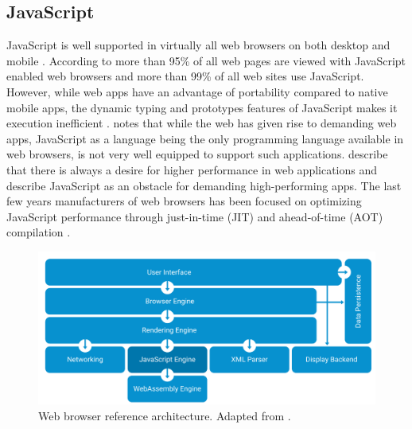 \subsection{JavaScript}

JavaScript is well supported in virtually all web browsers on both desktop and mobile \parencite{Zakai2011}. According to \textcite{TiwariSolihin2012} more than 95\% of all web pages are viewed with JavaScript enabled web browsers and more than 99\% of all web sites use JavaScript. However, while web apps have an advantage of portability compared to native mobile apps, the dynamic typing and prototypes features of JavaScript makes it execution inefficient \parencite{ParkJungMoon2015}. \textcite{HaasRossbergSchuffTitzerHolmanGohmanWagnerZakaiBastien2017} notes that while the web has given rise to demanding web apps, JavaScript as a language being the only programming language available in web browsers, is not very well equipped to support such applications. \textcite{ReiserBlaser2017} describe that there is always a desire for higher performance in web applications and \textcite{Zakai2018} describe JavaScript as an obstacle for demanding high-performing apps. The last few years manufacturers of web browsers has been focused on optimizing JavaScript performance through just-in-time (JIT) and ahead-of-time (AOT) compilation \parencite{HerreraChenLavoieHendren2018}.

\begin{figure}[!h]
\centering
\includegraphics[width=16cm,keepaspectratio]{figures/reference-architecture}
\caption{Web browser reference architecture. Adapted from \textcite{GrosskurthGodfrey2005}.}
\label{reference-architecture}
\end{figure}

